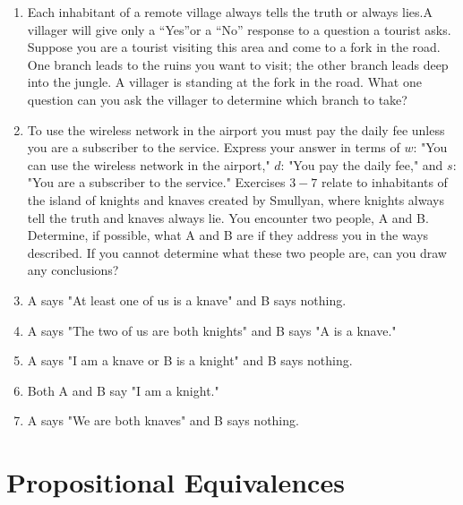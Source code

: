 \documentclass{sig-alternate-05-2015}
\begin{document}
\begin{enumerate}
\item Each inhabitant of a remote village always tells the truth
or always lies.A villager will give only a \textquotedblleft Yes\textquotedblright or a \textquotedblleft No\textquotedblright
response to a question a tourist asks. Suppose you are a
tourist visiting this area and come to a fork in the road.
One branch leads to the ruins you want to visit; the other
branch leads deep into the jungle. A villager is standing
at the fork in the road. What one question can you ask the
villager to determine which branch to take?

\item To use the wireless network in the airport you must pay
the daily fee unless you are a subscriber to the service.
Express your answer in terms of $w$: "You can use the wireless
network in the airport," $d$: "You pay the daily fee,"
and $s$: "You are a subscriber to the service."
\newline\newline
Exercises $3 - 7$ relate to inhabitants of the island of knights
and knaves created by Smullyan, where knights always tell
the truth and knaves always lie. You encounter two people,
A and B. Determine, if possible, what A and B are if they
address you in the ways described. If you cannot determine
what these two people are, can you draw any conclusions?

\item A says "At least one of us is a knave" and B says nothing.
\item A says "The two of us are both knights" and B says "A
is a knave."
\item A says "I am a knave or B is a knight" and B says nothing.
\item Both A and B say "I am a knight."
\item A says "We are both knaves" and B says nothing.

\end{enumerate}

\section{Propositional Equivalences}
\end{document}
